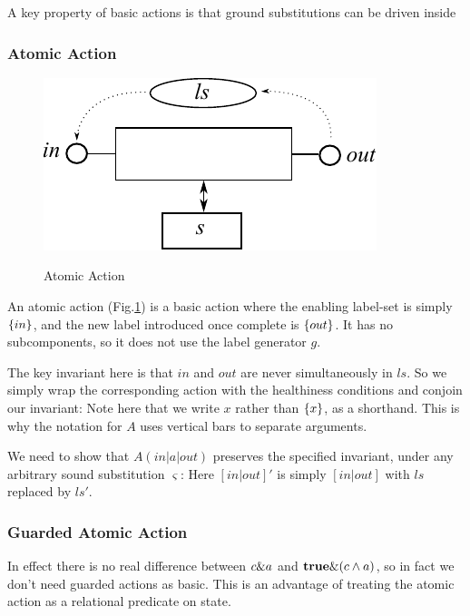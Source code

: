 A key property of basic actions is that ground substitutions
can be driven inside


\newpage
\subsubsection{Atomic Action}

\begin{figure}
  \centering
  \includegraphics{images/atomic-action}\\
  \caption{Atomic Action}
  \label{fig:atomic-action}
\end{figure}

An atomic action (Fig.\ref{fig:atomic-action})
is a basic action where the enabling label-set is
simply $\{in\}$, and the new label introduced once complete
is $\{out\}$.
It has no subcomponents, so it does not use the label generator $g$.

The key invariant here is that $in$ and $out$ are never simultaneously
in $ls$.
So we simply wrap the corresponding action with the healthiness conditions
and conjoin our invariant:
Note here that we write $x$ rather than $\{x\}$, as a shorthand.
This is why the notation for $A$ uses vertical bars to separate arguments.

We need to show that $A(in|a|out)$ preserves the specified
invariant, under any arbitrary sound substitution $\varsigma$:
Here $[in|out]'$ is simply $[in|out]$ with $ls$ replaced by $ls'$.

\subsubsection{Guarded Atomic Action}
In effect there is no real difference between $c \& a$
and $\mathbf{true} \& (c \land a)$,
so in fact we don't need guarded actions as basic.
This is an advantage of treating the atomic action as a relational predicate
on state.

